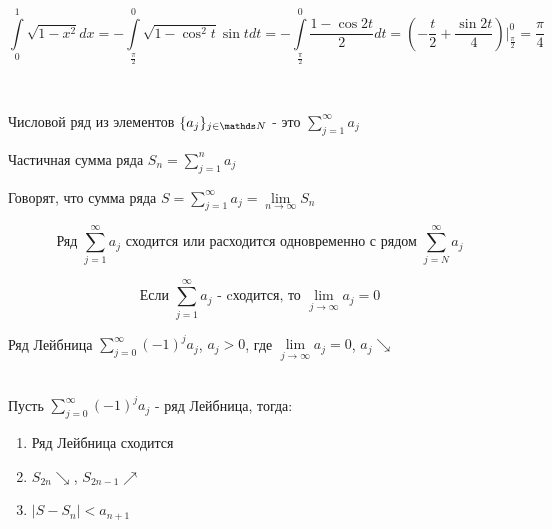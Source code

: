\documentclass[12pt, fleqn]{article}
\begin{document}
\begin{Property}[3]
\begin{Property}[4]
\begin{Property}[2, аддитивность]
\begin{Example}
    \[\int\limits_0^1 \sqrt{1-x^2} dx = - \int\limits_{\frac{\pi}{2}}^0 \sqrt{1-\cos^2 t} \sin t dt = - \int\limits_{\frac{\pi}{2}}^0 \frac{1 - \cos 2t}{2} dt = (-\frac{t}{2} + \frac{\sin 2t}{4}) \Big|_{\frac{\pi}{2}}^0 = \frac{\pi}{4}\]
\end{Example}

\newpage
\begin{Reminder} \
\begin{definition}
    Числовой ряд из элементов $\{a_j\}_{j \in \N}$ - это $\sum\limits_{j=1}^\infty a_j$
\end{definition}

\begin{definition}
    Частичная сумма ряда $S_n = \sum\limits_{j=1}^n a_j$
\end{definition}

\begin{definition}
    Говорят, что сумма ряда $S=\sum\limits_{j=1}^\infty a_j=\lim\limits_{n \rightarrow \infty} S_n$
\end{definition}

\begin{Remark}
    \[\text{Ряд $\sum\limits_{j=1}^\infty a_j$ сходится или расходится одновременно с рядом $\sum\limits_{j=N}^\infty a_j$}\]
\end{Remark}

\begin{Theorem} 
    \[\text{Если $\sum\limits_{j=1}^\infty a_j$ - cходится, то $\lim\limits_{j \rightarrow \infty} a_j = 0$}\]
\end{Theorem}

\begin{definition}
    Ряд Лейбница $\sum\limits_{j=0}^\infty (-1)^j a_j$, $a_j>0$, где $\lim\limits_{j \rightarrow \infty} a_j =0$, $a_j \searrow$
\end{definition}

\begin{theorem}\ \\
    Пусть $\sum\limits_{j=0}^\infty (-1)^j a_j$ - ряд Лейбница, тогда:
    \begin{enumerate}
        \item Ряд Лейбница сходится
        \item $S_{2n} \searrow$, $S_{2n-1} \nearrow$
        \item $|S-S_n|<a_{n+1}$
    \end{enumerate}
\end{theorem}


\end{Reminder}
\end{Property}
\end{Property}
\end{Property}
\end{document}
